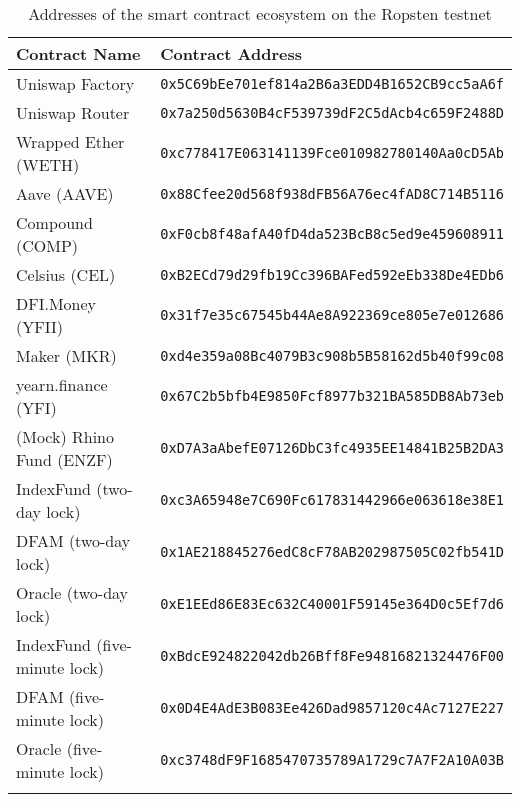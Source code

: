 \begin{longtable}{p{}p{}}
        \toprule 
        \textbf{Contract Name} & \textbf{Contract Address}\\
        \midrule
        Uniswap Factory & \texttt{0x5C69bEe701ef814a2B6a3EDD4B1652CB9cc5aA6f} \\
        Uniswap Router & \texttt{0x7a250d5630B4cF539739dF2C5dAcb4c659F2488D} \\
        \midrule
        Wrapped Ether (WETH) & \texttt{0xc778417E063141139Fce010982780140Aa0cD5Ab} \\
        Aave (AAVE) & \texttt{0x88Cfee20d568f938dFB56A76ec4fAD8C714B5116} \\
        Compound (COMP) & \texttt{0xF0cb8f48afA40fD4da523BcB8c5ed9e459608911} \\
        Celsius (CEL) & \texttt{0xB2ECd79d29fb19Cc396BAFed592eEb338De4EDb6} \\
        DFI.Money (YFII) & \texttt{0x31f7e35c67545b44Ae8A922369ce805e7e012686} \\
        Maker (MKR) & \texttt{0xd4e359a08Bc4079B3c908b5B58162d5b40f99c08} \\
        yearn.finance (YFI) & \texttt{0x67C2b5bfb4E9850Fcf8977b321BA585DB8Ab73eb} \\
        (Mock) Rhino Fund (ENZF) & \texttt{0xD7A3aAbefE07126DbC3fc4935EE14841B25B2DA3} \\
        \midrule
        IndexFund (two-day lock) & \texttt{0xc3A65948e7C690Fc617831442966e063618e38E1} \\
        DFAM (two-day lock) & \texttt{0x1AE218845276edC8cF78AB202987505C02fb541D} \\
        Oracle (two-day lock) & \texttt{0xE1EEd86E83Ec632C40001F59145e364D0c5Ef7d6} \\
        \midrule
        IndexFund (five-minute lock) & 
        \texttt{0xBdcE924822042db26Bff8Fe94816821324476F00} \\
        DFAM (five-minute lock) & \texttt{0x0D4E4AdE3B083Ee426Dad9857120c4Ac7127E227} \\
        Oracle (five-minute lock) & \texttt{0xc3748dF9F1685470735789A1729c7A7F2A10A03B} \\
        \bottomrule
        \caption{\label{tab:testnet} Addresses of the smart contract ecosystem on the Ropsten testnet}
\end{longtable}


